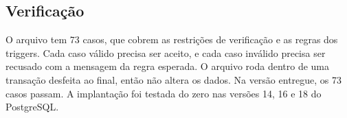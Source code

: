 \subsection{Verificação}

O arquivo  tem 73 casos, que cobrem as restrições de verificação e as regras dos triggers. Cada caso válido precisa ser aceito, e cada caso inválido precisa ser recusado com a mensagem da regra esperada. O arquivo roda dentro de uma transação desfeita ao final, então não altera os dados. Na versão entregue, os 73 casos passam. A implantação foi testada do zero nas versões 14, 16 e 18 do PostgreSQL.

